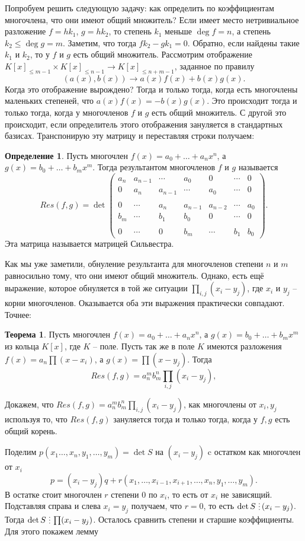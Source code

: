 \documentclass[10pt,a4paper,oneside]{book}
\theoremstyle{definition}
\newtheorem*{defn}{{\color{yellow!20!red} Определение}}
\newtheorem{thm}{{\color{red!40!black} Теорема}}
\newcommand{\di}{\mathop{\,\scalebox{0.85}{\raisebox{-1.2pt}[0.5\height]{\vdots}}\,}}
\def\thrm{\begin{thm}}
\def\ethrm{\end{thm}}
\def\dfn{\begin{defn}}
\def\edfn{\end{defn}}
\begin{document}
Попробуем решить следующую задачу: как определить по коэффициентам многочлена, что они имеют общий множитель? Если имеет место нетривиальное разложение $f=hk_1$, $g=hk_2$, то степень $k_1$ меньше $\deg f=n$, а степень $k_2\leq \deg g=m$. Заметим, что тогда $fk_2-gk_1=0$. Обратно, если найдены такие $k_1$ и $k_2$, то у $f$ и $g$ есть общий множитель. Рассмотрим отображение $K[x]_{\leq m-1}\times K[x]_{\leq n-1} \to K[x]_{\leq n+m-1}$, заданное по правилу
$$(a(x),b(x)) \to a(x)f(x)+b(x)g(x).$$ 
Когда это отображение вырождено? Тогда и только тогда, когда есть многочлены маленьких степеней, что $a(x)f(x)=-b(x)g(x)$. Это происходит тогда и только тогда, когда у многочленов $f$ и $g$ есть общий множитель. С другой это происходит, если определитель этого отображения зануляется в стандартных базисах. Транспонирую эту матрицу и переставляя строки получаем:

\dfn Пусть многочлен $f(x)=a_0+\dots+a_nx^n$, а $g(x)=b_0+\dots+b_mx^m$. Тогда результантом многочленов $f$ и $g$ называется $$Res(f,g)=  \det 
\begin{pmatrix}
a_n & a_{n-1} & \cdots & a_0 & 0 & \cdots & 0 \\
0 & a_n & a_{n-1} & \cdots & a_0 & \cdots & 0 \\
\\
0 & \cdots &  a_n & a_{n-1} & a_{n-2} & \cdots &  a_0 \\
b_m & \cdots & b_1 & b_0 & 0 & \cdots & 0 \\
 \\
0 & \cdots & 0 & b_m & \cdots & b_1 & b_0 
\end{pmatrix}.$$
Эта матрица называется матрицей Сильвестра. 
\edfn

Как мы уже заметили, обнуление результанта для многочленов степени $n$ и $m$ равносильно тому, что они имеют общий множитель. Однако, есть ещё выражение, которое обнуляется в той же ситуации $\prod_{i,j} (x_i-y_j)$, где $x_i$ и $y_j$ -- корни многочленов. Оказывается оба эти выражения практически совпадают. Точнее:

\thrm Пусть многочлен $f(x)=a_0+\dots+a_nx^n$, а $g(x)=b_0+\dots+b_mx^m$ из кольца $K[x]$, где $K$ -- поле. Пусть так же в поле $K$ имеются разложения $f(x)=a_n\prod(x-x_i)$, а $g(x)=\prod (x-y_j)$. Тогда
$$Res(f,g)=a_n^mb_m^n \prod_{i,j} (x_i-y_j),$$
\ethrm
\proof  Докажем, что $Res(f,g)=a_n^mb_m^n \prod_{i,j} (x_i-y_j)$, как многочлены от $x_i, y_j$ используя то, что $Res(f,g)$ зануляется тогда и только тогда, когда у $f,g$ есть общий корень.

Поделим $p(x_1\dots,x_n,y_1,\dots,y_m)=\det S$ на $(x_i-y_j)$ c остатком как многочлен от $x_i$
$$p=(x_i-y_j)q+r(x_1,\dots, x_{i-1},x_{i+1},\dots,x_n,y_1,\dots,y_m).$$
В остатке стоит многочлен $r$ степени 0 по $x_i$, то есть от $x_i$ не зависящий. Подставляя справа и слева $x_i=y_j$ получаем, что $r=0$, то есть $\det S \di (x_i-y_j)$. Тогда $\det S \di \prod (x_i-y_j)$. Осталось сравнить степени и старшие коэффициенты. Для этого покажем лемму
\end{document}
